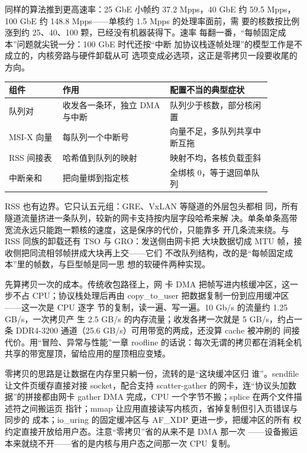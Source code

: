 同样的算法推到更高速率：25 GbE 小帧约 37.2 Mpps，40 GbE 约 59.5
Mpps，100 GbE 约 148.8 Mpps——单核约 1.5 Mpps 的处理率面前，需
要的核数按比例涨到约 25、40、100 颗，已经没有机器装得下。速率
每翻一番，“每帧固定成本”问题就尖锐一分：100 GbE 时代还按“中断
加协议栈逐帧处理”的模型工作是不成立的，内核旁路与硬件卸载从可
选项变成必选项，这正是零拷贝一段要收尾的方向。

\begin{longtable}{L{0.18\linewidth}L{0.36\linewidth}L{0.34\linewidth}}
\toprule
组件 & 作用 & 配置不当的典型症状 \\
\midrule
队列对 & 收发各一条环，独立 DMA 与中断 & 队列少于核数，部分核闲置 \\\tablerowrule
MSI-X 向量 & 每队列一个中断号 & 向量不足，多队列共享中断互拖 \\\tablerowrule
RSS 间接表 & 哈希值到队列的映射 & 映射不均，各核负载歪斜 \\\tablerowrule
中断亲和 & 把向量绑到指定核 & 全绑核 0，等于退回单队列 \\
\bottomrule
\end{longtable}

RSS 也有边界。它只认五元组：GRE、VxLAN 等隧道的外层包头都相
同，所有隧道流量挤进一条队列，较新的网卡支持按内层字段哈希来解
决。单条单条高带宽流永远只能跑一颗核的速度，这是保序的代价，只能靠多
开几条流来绕。与 RSS 同族的卸载还有 TSO 与 GRO：发送侧由网卡把
大块数据切成 MTU 帧，接收侧把同流相邻帧拼成大块再上交——它们
不改队列结构，改的是“每帧固定成本”里的帧数，与巨型帧是同一思
想的软硬件两种实现。

先算拷贝一次的成本。传统收包路径上，网
卡 DMA 把帧写进内核缓冲区，这一步不占 CPU；协议栈处理后再由
copy\_to\_user 把数据复制一份到应用缓冲区——这一次是 CPU 逐字
节的复制，读一遍、写一遍。10 Gb/s 的流量约 1.25 GB/s，一次拷贝产
生 2.5 GB/s 的内存流量；收发各拷一次就是 5 GB/s，约占一条
DDR4-3200 通道（25.6 GB/s）可用带宽的两成，还没算 cache 被冲刷的
间接代价。用“冒险、异常与性能”一章 roofline 的话说：每次无谓的拷贝都在消耗全机
共享的带宽屋顶，留给应用的屋顶相应变矮。

零拷贝的思路是让数据在内存里只躺一份，流转的是“这块缓冲区归
谁”。sendfile 让文件页缓存直接对接 socket，配合支持
scatter-gather 的网卡，连“协议头加数据”的拼接都由网卡 gather
DMA 完成，CPU 一个字节不搬；splice 在两个文件描述符之间搬运页
指针；mmap 让应用直接读写内核页，省掉复制但引入页错误与同步的
成本；io\_uring 的固定缓冲区与 AF\_XDP 更进一步，把缓冲区的所有
权约定直接开放给用户态。注意“零拷贝”省的从来不是 DMA 那一次
——设备搬运本来就绕不开——省的是内核与用户态之间那一次 CPU
复制。

